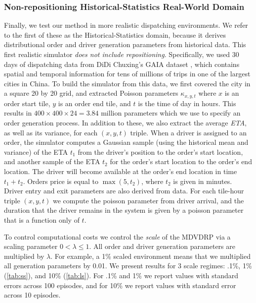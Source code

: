 \subsubsection{Non-repositioning Historical-Statistics Real-World Domain}

Finally, we test our method in more realistic dispatching environments. We refer to the first of these as the Historical-Statistics domain, because it derives distributional order and driver generation parameters from historical data. This first realistic simulator {\em does not include repositioning}. Specifically, we used 30 days of dispatching data from DiDi Chuxing's GAIA dataset \cite{gaia2017}, which contains spatial and temporal information for tens of millions of trips in one of the largest cities in China. To build the simulator from this data, we first covered the city in a square 20 by 20 grid, and extracted Poisson parameters $\kappa_{x,y,t}$ where $x$ is an order start tile, $y$ is an order end tile, and $t$ is the time of day in hours. This results in $400 \times 400 \times 24 = 3.84$ million parameters which we use to specify an order generation process. In addition to these, we also extract the average {\em ETA}, as well as its variance, for each $(x, y, t)$ triple. When a driver is assigned to an order, the simulator computes a Gaussian sample (using the historical mean and variance) of the ETA $t_1$ from the driver's position to the order's start location, and another sample of the ETA $t_2$ for the order's start location to the order's end location. The driver will become available at the order's end location in time $t_1 + t_2$. Orders price is equal to $\max(5, t_2)$, where $t_2$ is given in minutes. Driver entry and exit parameters are also derived from data. For each tile-hour triple $(x,y,t)$ we compute the poisson parameter from driver arrival, and the duration that the driver remains in the system is given by a poisson parameter that is a function only of $t$.

To control computational costs we control the {\em scale} of the MDVDRP via a scaling parameter $0 < \lambda \leq 1$. All order and driver generation parameters are multiplied by $\lambda$. For example, a 1\% scaled environment means that we multiplied all generation parameters by 0.01. We present results for 3 scale regimes: .1\%, 1\% (\cref{tab:ss}), and 10\% (\cref{tab:ls}). For .1\% and 1\% we report values with standard errors across 100 episodes, and for 10\% we report values with standard error across 10 episodes. 

